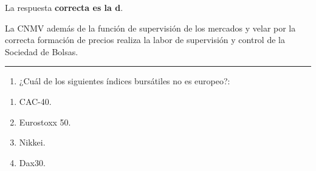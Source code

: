 \documentclass[
  letterpaper,
  DIV=11,
  numbers=noendperiod]{scrreprt}
\providecommand{\tightlist}{%
  \setlength{\itemsep}{0pt}\setlength{\parskip}{0pt}}\usepackage{longtable,booktabs,array}
\begin{document}
\begin{tcolorbox}[enhanced jigsaw, left=2mm, opacityback=0, colback=white, breakable, arc=.35mm, bottomrule=.15mm, rightrule=.15mm, toprule=.15mm, leftrule=.75mm, colframe=quarto-callout-tip-color-frame]
\begin{minipage}[t]{5.5mm}
\textcolor{quarto-callout-tip-color}{\faLightbulb}
\end{minipage}%
\begin{minipage}[t]{\textwidth - 5.5mm}

La respuesta \textbf{correcta es la d}.

La CNMV además de la función de supervisión de los mercados y velar por
la correcta formación de precios realiza la labor de supervisión y
control de la Sociedad de Bolsas.

\end{minipage}%
\end{tcolorbox}

\begin{center}\rule{0.5\linewidth}{0.5pt}\end{center}

\begin{enumerate}
\def\labelenumi{\arabic{enumi}.}
\setcounter{enumi}{37}
\tightlist
\item
  ¿Cuál de los siguientes índices bursátiles no es europeo?:
\end{enumerate}

\begin{enumerate}
\def\labelenumi{\alph{enumi})}
\item
  CAC-40.
\item
  Eurostoxx 50.
\item
  Nikkei.
\item
  Dax30.
\end{enumerate}
\end{document}
